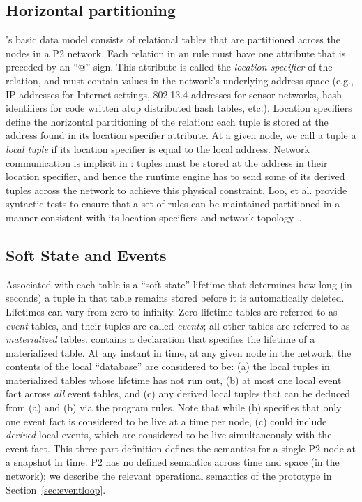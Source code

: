\subsection{Horizontal partitioning}

\OVERLOG's basic data model consists of relational tables that are partitioned
across the nodes in a P2 network.  Each relation in an \OVERLOG rule must have
one attribute that is preceded by an ``@'' sign.  This attribute is called the
{\em location specifier} of the relation, and must contain values in the
network's underlying address space (e.g., IP addresses for Internet settings,
802.13.4 addresses for sensor networks, hash-identifiers for code written atop
distributed hash tables, etc.).  Location specifiers define the horizontal
partitioning of the relation: each tuple is stored at the address found in its
location specifier attribute.  At a given node, we call a tuple a {\em local
tuple} if its location specifier is equal to the local address.  Network
communication is implicit in \OVERLOG: tuples must be stored at the address in
their location specifier, and hence the runtime engine has to send some of its
derived tuples across the network to achieve this physical constraint.  Loo, et
al.  provide syntactic tests to ensure that a set of rules can be maintained
partitioned in a manner consistent with its location specifiers and network
topology~\cite{loo-sigmod06}.


\subsection{Soft State and Events}

Associated with each \OVERLOG table is a ``soft-state'' lifetime that
determines how long (in seconds) a tuple in that table remains stored before it
is automatically deleted.  Lifetimes can vary from zero to infinity.
Zero-lifetime tables are referred to as {\em event} tables, and their tuples
are called \emph{events}; all other tables are referred to as {\em
materialized} tables.  \OVERLOG contains a  declaration that
specifies the lifetime of a materialized table.  At any instant in time, at any
given node in the network, the contents of the local \OVERLOG ``database'' are
considered to be: (a) the local tuples in materialized tables whose lifetime
has not run out, (b) at most one local event fact across {\em all} event
tables, and (c) any derived local tuples that can be deduced from (a) and (b)
via the program rules.  Note that while (b) specifies that only one event fact
is considered to be live at a time per node, (c) could include {\em derived}
local events, which are considered to be live simultaneously with the event
fact.  This three-part definition defines the semantics for a single P2 node at
a snapshot in time.  P2 has no defined semantics across time and space (in the
network); we describe the relevant operational semantics of the prototype in
Section~\ref{sec:eventloop}.
     
